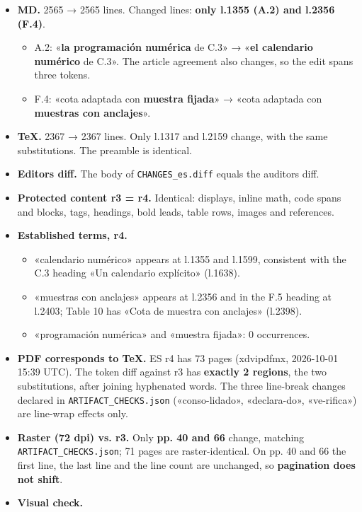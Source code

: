 \documentclass[
]{article}
\providecommand{\tightlist}{%
  \setlength{\itemsep}{0pt}\setlength{\parskip}{0pt}}
\begin{document}
\begin{itemize}
\tightlist
\item
  \textbf{MD.} 2565 → 2565 lines. Changed lines: \textbf{only l.1355
  (A.2) and l.2356 (F.4)}.

  \begin{itemize}
  \tightlist
  \item
    A.2: «\textbf{la programación numérica} de C.3» → «\textbf{el
    calendario numérico} de C.3». The article agreement also changes, so
    the edit spans three tokens.
  \item
    F.4: «cota adaptada con \textbf{muestra fijada}» → «cota adaptada
    con \textbf{muestras con anclajes}».
  \end{itemize}
\item
  \textbf{TeX.} 2367 → 2367 lines. Only l.1317 and l.2159 change, with
  the same substitutions. The preamble is identical.
\item
  \textbf{Editor\textquotesingle s diff.} The body of
  \texttt{CHANGES\_es.diff} equals the auditor\textquotesingle s diff.
\item
  \textbf{Protected content r3 = r4.} Identical: displays, inline math,
  code spans and blocks, tags, headings, bold leads, table rows, images
  and references.
\item
  \textbf{Established terms, r4.}

  \begin{itemize}
  \tightlist
  \item
    «calendario numérico» appears at l.1355 and l.1599, consistent with
    the C.3 heading «Un calendario explícito» (l.1638).
  \item
    «muestras con anclajes» appears at l.2356 and in the F.5 heading at
    l.2403; Table 10 has «Cota de muestra con anclajes» (l.2398).
  \item
    «programación numérica» and «muestra fijada»: 0 occurrences.
  \end{itemize}
\item
  \textbf{PDF corresponds to TeX.} ES r4 has 73 pages (xdvipdfmx,
  2026-10-01 15:39 UTC). The token diff against r3 has \textbf{exactly 2
  regions}, the two substitutions, after joining hyphenated words. The
  three line-break changes declared in \texttt{ARTIFACT\_CHECKS.json}
  («conso-lidado», «declara-do», «ve-rifica») are line-wrap effects
  only.
\item
  \textbf{Raster (72 dpi) vs. r3.} Only \textbf{pp. 40 and 66} change,
  matching \texttt{ARTIFACT\_CHECKS.json}; 71 pages are
  raster-identical. On pp. 40 and 66 the first line, the last line and
  the line count are unchanged, so \textbf{pagination does not shift}.
\item
  \textbf{Visual check.}


\end{itemize}
\end{document}
